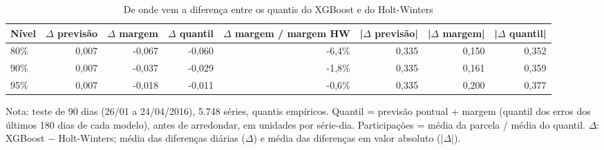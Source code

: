\begin{table}[htbp]
\centering
\small
\caption{De onde vem a diferença entre os quantis do XGBoost e do Holt-Winters}
\label{tab:comp_composicao_diferenca}
\begin{tabular}{lrrrrrrr}
\toprule
Nível & $\Delta$ previsão & $\Delta$ margem & $\Delta$ quantil & $\Delta$ margem / margem HW & |$\Delta$ previsão| & |$\Delta$ margem| & |$\Delta$ quantil| \\
\midrule
80\% & 0,007 & -0,067 & -0,060 & -6,4\% & 0,335 & 0,150 & 0,352 \\
90\% & 0,007 & -0,037 & -0,029 & -1,8\% & 0,335 & 0,161 & 0,359 \\
95\% & 0,007 & -0,018 & -0,011 & -0,6\% & 0,335 & 0,200 & 0,377 \\
\bottomrule
\end{tabular}
\par\smallskip
{\footnotesize Nota: teste de 90 dias (26/01 a 24/04/2016), 5.748 séries, quantis empíricos. Quantil = previsão pontual + margem (quantil dos erros dos últimos 180 dias de cada modelo), antes de arredondar, em unidades por série-dia. Participações = média da parcela / média do quantil. $\Delta$: XGBoost $-$ Holt-Winters; média das diferenças diárias ($\Delta$) e média das diferenças em valor absoluto (|$\Delta$|).}
\end{table}
